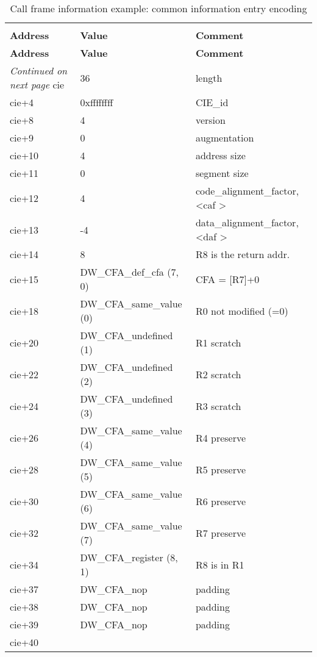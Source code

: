 \begin{centering}
\setlength{\extrarowheight}{0.1cm}
\begin{longtable}{lll}
  \caption{Call frame information example: common information entry encoding} \label{tab:callframeinformationexamplecommoninformationentryencoding} \\
  \hline \\ \bfseries Address &\bfseries Value &\bfseries Comment \\ \hline
\endfirsthead
  \bfseries Address &\bfseries Value &\bfseries Comment \\ \hline
\endhead
  \hline \emph{Continued on next page}
\endfoot
  \hline
\endlastfoot
cie&36&length    \\
cie+4&0xffffffff&CIE\_id    \\
cie+8&4&version    \\
cie+9&0&augmentation     \\
cie+10&4&address size    \\
cie+11&0&segment size    \\
cie+12&4&code\_alignment\_factor, \textless caf \textgreater    \\
cie+13&-4&data\_alignment\_factor, \textless daf \textgreater    \\
cie+14&8&R8 is the return addr.    \\
cie+15&DW\_CFA\_def\_cfa (7, 0)&CFA = [R7]+0    \\
cie+18&DW\_CFA\_same\_value (0)&R0 not modified (=0)    \\
cie+20&DW\_CFA\_undefined (1)&R1 scratch    \\
cie+22&DW\_CFA\_undefined (2)&R2 scratch    \\
cie+24&DW\_CFA\_undefined (3)&R3 scratch    \\
cie+26&DW\_CFA\_same\_value (4)&R4 preserve    \\
cie+28&DW\_CFA\_same\_value (5)&R5 preserve    \\
cie+30&DW\_CFA\_same\_value (6)&R6 preserve    \\
cie+32&DW\_CFA\_same\_value (7)&R7 preserve    \\
cie+34&DW\_CFA\_register (8, 1)&R8 is in R1    \\
cie+37&DW\_CFA\_nop&padding    \\
cie+38&DW\_CFA\_nop& padding \\
cie+39& DW\_CFA\_nop&padding  \\
cie+40 &&  \\
\end{longtable}
\end{centering}


